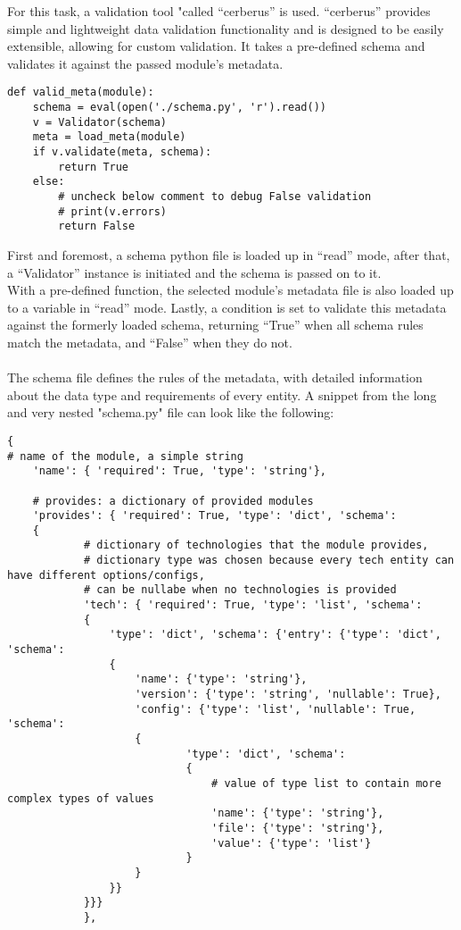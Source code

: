 For this task, a validation tool "called “cerberus” is used. “cerberus” provides simple and lightweight data validation functionality and is designed to be easily extensible, allowing for custom validation\cite{cerberus}. It takes a pre-defined schema and validates it against the passed module’s metadata.

\begin{lstlisting}[caption=Metadata validation, style=pythonstyle]
def valid_meta(module):
    schema = eval(open('./schema.py', 'r').read())
    v = Validator(schema)
    meta = load_meta(module)
    if v.validate(meta, schema):
        return True
    else:
        # uncheck below comment to debug False validation
        # print(v.errors)
        return False
\end{lstlisting}


First and foremost, a schema python file is loaded up in “read” mode, after that, a “Validator” instance is initiated and the schema is passed on to it.\\
With a pre-defined function, the selected module’s metadata file is also loaded up to a variable in “read” mode. Lastly, a condition is set to validate this metadata against the formerly loaded schema, returning “True” when all schema rules match the metadata, and “False” when they do not.\\
\\
The schema file defines the rules of the metadata, with detailed information about the data type and requirements of every entity. A snippet from the long and very nested "schema.py" file can look like the following:
\\
\begin{lstlisting}[caption=Validation schema, style=pythonstyle]
{
# name of the module, a simple string
    'name': { 'required': True, 'type': 'string'},

    # provides: a dictionary of provided modules
    'provides': { 'required': True, 'type': 'dict', 'schema':
    {
            # dictionary of technologies that the module provides,
            # dictionary type was chosen because every tech entity can have different options/configs,
            # can be nullabe when no technologies is provided
            'tech': { 'required': True, 'type': 'list', 'schema':
            {
                'type': 'dict', 'schema': {'entry': {'type': 'dict', 'schema':
                {
                    'name': {'type': 'string'},
                    'version': {'type': 'string', 'nullable': True},
                    'config': {'type': 'list', 'nullable': True, 'schema':
                    {
                            'type': 'dict', 'schema':
                            {
                                # value of type list to contain more complex types of values
                                'name': {'type': 'string'},
                                'file': {'type': 'string'},
                                'value': {'type': 'list'}
                            }
                    }
                }}
            }}}
            },
\end{lstlisting}
